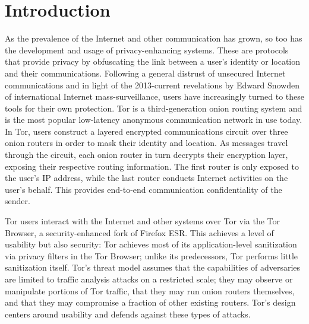 \documentclass[USenglish,oneside,twocolumn]{article}
\begin{document}

 
\maketitle

\section{Introduction}

As the prevalence of the Internet and other communication has grown, so too has the development and usage of privacy-enhancing systems. These are protocols that provide privacy by obfuscating the link between a user's identity or location and their communications. Following a general distrust of unsecured Internet communications and in light of the 2013-current revelations by Edward Snowden of international Internet mass-surveillance, users have increasingly turned to these tools for their own protection.
\newpage
Tor \cite{dingledine2004tor} is a third-generation onion routing system and is the most popular low-latency anonymous communication network in use today. In Tor, users construct a layered encrypted communications circuit over three onion routers in order to mask their identity and location. As messages travel through the circuit, each onion router in turn decrypts their encryption layer, exposing their respective routing information. The first router is only exposed to the user's IP address, while the last router conducts Internet activities on the user's behalf. This provides end-to-end communication confidentiality of the sender.


Tor users interact with the Internet and other systems over Tor via the Tor Browser, a security-enhanced fork of Firefox ESR. This achieves a level of usability but also security: Tor achieves most of its application-level sanitization via privacy filters in the Tor Browser; unlike its predecessors, Tor performs little sanitization itself. Tor's threat model assumes that the capabilities of adversaries are limited to traffic analysis attacks on a restricted scale; they may observe or manipulate portions of Tor traffic, that they may run onion routers themselves, and that they may compromise a fraction of other existing routers. Tor's design centers around usability and defends against these types of attacks.
\end{document}

